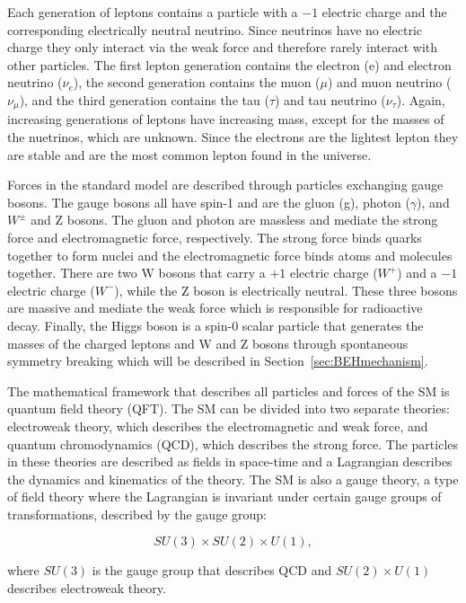 Each generation of leptons contains a particle with a $-1$ electric charge and the corresponding electrically neutral neutrino. Since neutrinos have no electric charge they only interact via the weak force and therefore rarely interact with other particles. The first lepton generation contains the electron (e) and electron neutrino ($\nu_{e}$), the second generation contains the muon ($\mu$) and muon neutrino ($\nu_{\mu}$), and the third generation contains the tau ($\tau$) and tau neutrino ($\nu_{\tau}$). Again, increasing generations of leptons have increasing mass, except for the masses of the nuetrinos, which are unknown. Since the electrons are the lightest lepton they are stable and are the most common lepton found in the universe. 

Forces in the standard model are described through particles exchanging gauge bosons. The gauge bosons all have spin-1 and are the gluon (g), photon ($\gamma$), and $W^{\pm}$ and Z bosons. The gluon and photon are massless and mediate the strong force and electromagnetic force, respectively. The strong force binds quarks together to form nuclei and the electromagnetic force binds atoms and molecules together. There are two W bosons that carry a $+1$ electric charge ($W^{+}$) and a $-1$ electric charge ($W^{-}$), while the Z boson is electrically neutral. These three bosons are massive and mediate the weak force which is responsible for radioactive decay. Finally, the Higgs boson is a spin-0 scalar particle that generates the masses of the charged  leptons and W and Z bosons through spontaneous symmetry breaking which will be described in Section~\ref{sec:BEHmechanism}.

The mathematical framework that describes all particles and forces of the SM is quantum field theory (QFT). The SM can be divided into two separate theories: electroweak theory, which describes the electromagnetic and weak force, and quantum chromodynamics (QCD), which describes the strong force. The particles in these theories are described as fields in space-time and a Lagrangian describes the dynamics and kinematics of the theory. The SM is also a gauge theory, a type of field theory where the Lagrangian is invariant under certain gauge groups of transformations, described by the gauge group: 

\begin{equation}
SU(3)\times SU(2)\times U(1),
\end{equation}

\noindent
where $SU(3)$ is the gauge group that describes QCD and $SU(2)\times U(1)$ describes electroweak theory. 

